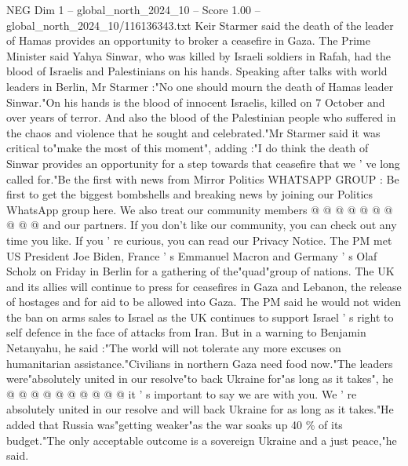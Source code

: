 \begin{textsample}{NEG Dim 1 – global\_north\_2024\_10 – Score 1.00 – global\_north\_2024\_10/116136343.txt}  \label{ex:f1_neg_371}
Keir Starmer said the death of the leader of Hamas provides an opportunity to broker a ceasefire in Gaza.
The Prime Minister said Yahya Sinwar, who was killed by Israeli soldiers in Rafah, had the blood of Israelis and Palestinians on his hands.
Speaking after talks with world leaders in Berlin, Mr Starmer :"No one should mourn the death of Hamas leader Sinwar."On his hands is the blood of innocent Israelis, killed on 7 October and over years of terror.
And also the blood of the Palestinian people who suffered in the chaos and violence that he sought and celebrated."Mr Starmer said it was critical to"make the most of this moment", adding :"I do think the death of Sinwar provides an opportunity for a step towards that ceasefire that we ' ve long called for."Be the first with news from Mirror Politics WHATSAPP GROUP : Be first to get the biggest bombshells and breaking news by joining our Politics WhatsApp group here.
We also treat our community members @ @ @ @ @ @ @ @ @ @ and our partners.
If you don't like our community, you can check out any time you like.
If you ' re curious, you can read our Privacy Notice.
The PM met US President Joe Biden, France ' s Emmanuel Macron and Germany ' s Olaf Scholz on Friday in Berlin for a gathering of the"quad"group of nations.
The UK and its allies will continue to press for ceasefires in Gaza and Lebanon, the release of hostages and for aid to be allowed into Gaza.
The PM said he would not widen the ban on arms sales to Israel as the UK continues to support Israel ' s right to self defence in the face of attacks from Iran.
But in a warning to Benjamin Netanyahu, he said :"The world will not tolerate any more excuses on humanitarian assistance."Civilians in northern Gaza need food now."The leaders were"absolutely united in our resolve"to back Ukraine for"as long as it takes", he @ @ @ @ @ @ @ @ @ @ it ' s important to say we are with you.
We ' re absolutely united in our resolve and will back Ukraine for as long as it takes."He added that Russia was"getting weaker"as the war soaks up 40 \% of its budget."The only acceptable outcome is a sovereign Ukraine and a just peace,"he said.

\end{textsample}
